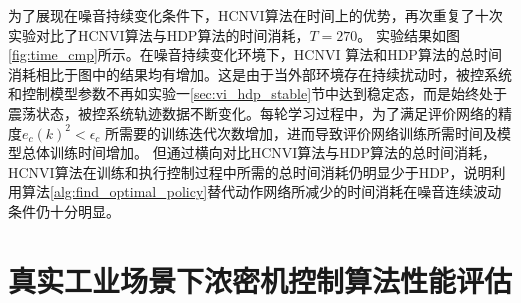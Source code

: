 为了展现在噪音持续变化条件下，HCNVI算法在时间上的优势，再次重复了十次实验对比了HCNVI算法与HDP算法的时间消耗，$T=270$。
实验结果如图\ref{fig:time_cmp}所示。在噪音持续变化环境下，HCNVI
算法和HDP算法的总时间消耗相比于图中的结果均有增加。这是由于当外部环境存在持续扰动时，被控系统和控制模型参数不再如实验一\ref{sec:vi_hdp_stable}节中达到稳定态，而是始终处于震荡状态，被控系统轨迹数据不断变化。每轮学习过程中，为了满足评价网络的精度$e_{c}(k)^{2}<\epsilon_{c}$
所需要的训练迭代次数增加，进而导致评价网络训练所需时间及模型总体训练时间增加。
但通过横向对比HCNVI算法与HDP算法的总时间消耗，HCNVI算法在训练和执行控制过程中所需的总时间消耗仍明显少于HDP，说明利用算法\ref{alg:find_optimal_policy}替代动作网络所减少的时间消耗在噪音连续波动条件仍十分明显。



\section{真实工业场景下浓密机控制算法性能评估}

